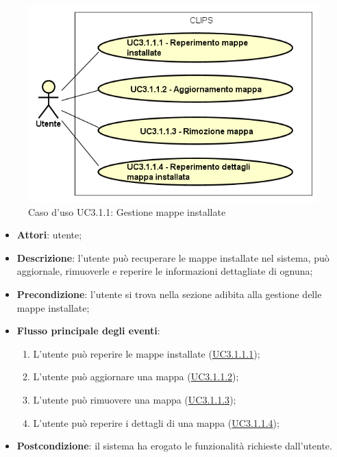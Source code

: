 \documentclass[../AnalisiDeiRequisiti.tex]{subfiles}
\begin{document}
        \begin{figure}[H]
            \centering
            \includegraphics[scale=0.95, width=\textwidth]{img/UC3-1-1.png}
            \caption{Caso d'uso UC3.1.1: Gestione mappe installate}\label{fig:UC3.1.1} 
        \end{figure}
\begin{itemize}
\item \textbf{Attori}: utente;
\item \textbf{Descrizione}: l'utente può recuperare le mappe installate nel sistema, può aggiornale, rimuoverle e reperire le informazioni dettagliate di ognuna; 
      \item \textbf{Precondizione}: l'utente si trova nella sezione adibita alla gestione delle mappe installate;

        \item \textbf{Flusso principale degli eventi}:
          \begin{enumerate}
          \item L'utente può reperire le mappe installate (\hyperlink{UC3.1.1.1}{UC3.1.1.1});
          \item L'utente può aggiornare una mappa (\hyperlink{UC3.1.1.2}{UC3.1.1.2});
          \item L'utente può rimuovere una mappa (\hyperlink{UC3.1.1.3}{UC3.1.1.3});
          \item L'utente può reperire i dettagli di una mappa (\hyperlink{UC3.1.1.4}{UC3.1.1.4});

      \end{enumerate}
    \item \textbf{Postcondizione}: il sistema ha erogato le funzionalità richieste dall'utente.
  \end{itemize}
\hypertarget{UC3.1.1.1}{}
\end{document}
